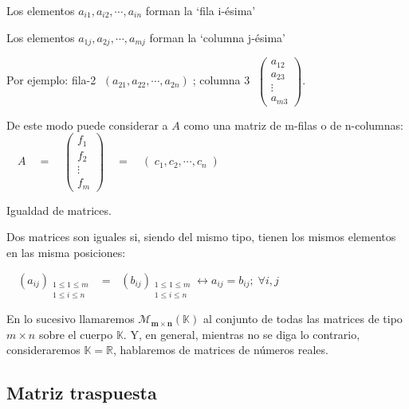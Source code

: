 Los elementos $a_{i1}, a_{i2}, \cdots , a_{in}$ forman la `fila i-ésima'

Los elementos $a_{1j}, a_{2j}, \cdots , a_{mj}$ forman la `columna j-ésima'

Por ejemplo: \hspace{2mm} fila-2 $\; (a_{21}, a_{22}, \cdots , a_{2n})\; $;\hspace{2mm} columna 3 $\; \left(\begin{matrix} a_{12} \\ a_{23}\\ \vdots \\ a_{m3}   \end{matrix}  \right)$. 

De este modo puede considerar a $A$ como una matriz de m-filas o de n-columnas:
$\quad A \quad=\quad \left( \begin{matrix} f_1 \\f_2\\ \vdots \\ f_m \end{matrix} \right) \quad = \quad  (\;c_1, c_2, \cdots, c_n \;)$


\begin{defi}Igualdad de matrices.

Dos matrices son iguales si, siendo del mismo tipo, tienen los mismos elementos en las misma posiciones:

$\quad { \left( { a }_{ ij } \right)  }_{ \begin{matrix} 1\le 1\le m \\ 1\le i\le n \end{matrix} }$
$\; = \; $
${ \left( { b }_{ ij } \right)  }_{ \begin{matrix} 1\le 1\le m \\ 1\le i\le n \end{matrix} } \leftrightarrow a_{ij}=b_{ij}; \; \forall i,j$

\end{defi}

En lo sucesivo llamaremos $\boldsymbol{ \mathcal M_{m\times n}(\mathbb K) }$ al conjunto de todas las matrices de tipo $m\times n$ sobre el cuerpo $\mathbb K$. Y, en general, mientras no se diga lo contrario, consideraremos $\mathbb K=\mathbb R$, hablaremos de matrices de números reales.

\subsection{Matriz traspuesta}

